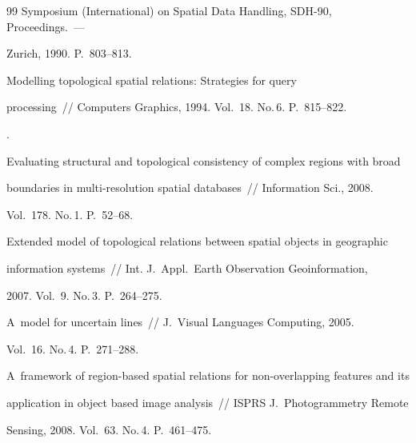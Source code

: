 {{\begin{thebibliography}{99}
Symposium (International) on Spatial Data Handling, SDH-90, Proceedings.~--- 


Zurich, 1990. P.~803--813. 









Modelling topological spatial relations: Strategies for query 


processing~/\!\!/ Computers Graphics, 1994. Vol.~18. No.\,6.  P.~815--822.







.


Evaluating structural and topological consistency of complex regions with broad 


boundaries in multi-resolution spatial databases~/\!\!/ Information Sci., 2008. 


Vol.~178. No.\,1. P.~52--68.









Extended model of topological relations between spatial objects in geographic 


information systems~/\!\!/ Int. J.~Appl.\ Earth Observation Geoinformation, 


2007. Vol.~9. No.\,3. P.~264--275.









A~model for uncertain lines~/\!\!/ J.~Visual Languages Computing, 2005. 


Vol.~16. No.\,4. P.~271--288.









A~framework of region-based spatial relations for non-overlapping features and its 


application in object based image analysis~/\!\!/ ISPRS J.~Photogrammetry Remote 


Sensing, 2008. Vol.~63. No.\,4. P.~461--475.






\end{thebibliography}}}
